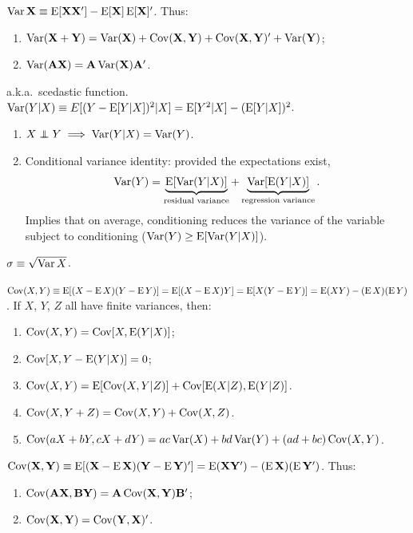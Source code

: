 \documentclass[8pt,letterpaper, landscape]{extarticle} %
\newcommand{\mA}{\ensuremath{\mathbf{A}}}
\newcommand{\mB}{\ensuremath{\mathbf{B}}}
\newcommand{\mX}{\ensuremath{\mathbf{X}}}
\newcommand{\mY}{\ensuremath{\mathbf{Y}}}
\begin{document}
\begin{multicols}{3}
\begin{description}
 $ \Var \mX \equiv \E [ \mX \mX' ] - \E [ \mX ] \E [ \mX ]' $. Thus:
\begin{enumerate}
\item $ \Var ( \mX + \mY ) = \Var ( \mX ) + \Cov ( \mX , \mY ) + \Cov ( \mX , \mY )' + \Var ( \mY ) $;
\item $ \Var (\mA \mX) = \mA \Var ( \mX ) \mA' $.
\end{enumerate}

 a.k.a.\ scedastic function. $ \operatorname{Var} (Y|X) \equiv E[ (Y - \operatorname{E} [Y|X] )^2 | X] = \operatorname{E} [Y^2 | X] - (\operatorname{E} [Y|X])^2 $.
\begin{enumerate}
\item $ X \independent Y \implies \Var (Y | X) = \Var (Y) $.
\item Conditional variance identity: provided the expectations exist,
$$ \operatorname{Var} (Y) = \underbrace{\operatorname{E} [\operatorname{Var} (Y|X)]}_{\text{residual variance}} + \underbrace{\operatorname{Var} [\operatorname{E} (Y|X)]}_{\text{regression variance}} . $$
Implies that on average, conditioning reduces the variance of the variable subject to conditioning ($ \operatorname{Var} (Y) \geq \operatorname{E} [\operatorname{Var} (Y|X)] $).
\end{enumerate}

 $ \sigma \equiv \sqrt{\operatorname{Var} X} $.

 $ \operatorname{Cov} (X, Y) \equiv \operatorname{E} [ (X - \operatorname{E} X) (Y - \operatorname{E} Y)] = \operatorname{E} [ (X - \operatorname{E} X) Y ] = \operatorname{E} [ X (Y - \operatorname{E} Y)] = \operatorname{E} (XY) - (\operatorname{E} X )( \operatorname{E} Y) $. If $ X $, $ Y $, $ Z $ all have finite variances, then:
\begin{enumerate}
\item $ \operatorname{Cov} (X, Y) = \operatorname{Cov} [X, \operatorname{E}(Y|X)] $;
\item $ \operatorname{Cov} [X, Y - \operatorname{E}(Y|X) ] = 0 $;
\item $ \operatorname{Cov} (X, Y) = \operatorname{E} [\operatorname{Cov}(X, Y|Z)] + \operatorname{Cov}[\operatorname{E}(X|Z), \operatorname{E} (Y|Z) ] $.
\item $ \operatorname{Cov} (X, Y+Z) = \operatorname{Cov} (X, Y) + \operatorname{Cov} (X,Z) $.
\item $ \operatorname{Cov} (aX + bY , cX + dY) = ac \operatorname{Var} (X) + bd \operatorname{Var} (Y) + (ad+bc) \operatorname{Cov} (X,Y) $.
\end{enumerate}

 $ \Cov (\mX, \mY) \equiv \E [(\mX - \E \mX)(\mY - \E \mY)'] = \E (\mX \mY') - ( \E \mX ) (\E \mY')  $. Thus:
\begin{enumerate}
\item $ \Cov (\mA \mX, \mB \mY) = \mA \Cov (\mX, \mY) \mB' $;
\item $ \Cov (\mX, \mY) = \Cov ( \mY , \mX )' $.
\end{enumerate}


\end{description}
\end{multicols}
\end{document}
